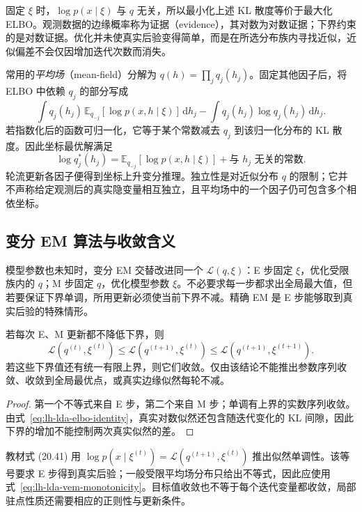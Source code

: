 固定 $\xi$ 时，$\log p(x\mid\xi)$ 与 $q$ 无关，所以最小化上述 KL 散度等价于最大化 ELBO。观测数据的边缘概率称为证据（evidence），其对数为对数证据；下界约束的是对数证据。优化并未使真实后验变得简单，而是在所选分布族内寻找近似，近似偏差不会仅因增加迭代次数而消失。

常用的\emph{平均场}（mean-field）分解为 $q(h)=\prod_jq_j(h_j)$。固定其他因子后，将 ELBO 中依赖 $q_j$ 的部分写成
\[
\int q_j(h_j)\,\mathbb E_{q_{-j}}[\log p(x,h\mid\xi)]\,\mathrm dh_j
-\int q_j(h_j)\log q_j(h_j)\,\mathrm dh_j.
\]
若指数化后的函数可归一化，它等于某个常数减去 $q_j$ 到该归一化分布的 KL 散度。因此坐标最优解满足
\begin{equation}
\log q_j^*(h_j)=\mathbb E_{q_{-j}}[\log p(x,h\mid\xi)]+\text{与 $h_j$ 无关的常数}.
\label{eq:lh-lda-mean-field-coordinate}
\end{equation}
轮流更新各因子便得到坐标上升变分推理。独立性是对近似分布 $q$ 的限制；它并不声称给定观测后的真实隐变量相互独立，且平均场中的一个因子仍可包含多个相依坐标。

\subsection{变分 EM 算法与收敛含义}
\label{subsec:lh-lda-variational-em-principle}

模型参数也未知时，变分 EM 交替改进同一个 $\mathcal L(q,\xi)$：E 步固定 $\xi$，优化受限族内的 $q$；M 步固定 $q$，优化模型参数 $\xi$。不必要求每一步都求出全局最大值，但若要保证下界单调，所用更新必须使当前下界不减。精确 EM 是 E 步能够取到真实后验的特殊情形。

\begin{proposition}[下界的单调性]
\label{prop:lh-lda-vem-monotonicity}
若每次 E、M 更新都不降低下界，则
\begin{equation}
\mathcal L(q^{(t)},\xi^{(t)})
\leq\mathcal L(q^{(t+1)},\xi^{(t)})
\leq\mathcal L(q^{(t+1)},\xi^{(t+1)}).
\label{eq:lh-lda-vem-monotonicity}
\end{equation}
若这些下界值还有统一有限上界，则它们收敛。仅由该结论不能推出参数序列收敛、收敛到全局最优点，或真实边缘似然每轮不减。
\end{proposition}
\begin{proof}
第一个不等式来自 E 步，第二个来自 M 步；单调有上界的实数序列收敛。由式~\eqref{eq:lh-lda-elbo-identity}，真实对数似然还包含随迭代变化的 KL 间隙，因此下界的增加不能控制两次真实似然的差。
\end{proof}

\begin{notealert}[type=caution,title={不能把精确 EM 的等号直接用于变分 EM}]
教材式 (20.41) 用 $\log p(x\mid\xi^{(t)})=\mathcal L(q^{(t+1)},\xi^{(t)})$ 推出似然单调性。该等号要求 E 步得到真实后验；一般受限平均场分布只给出不等式，因此应使用式~\eqref{eq:lh-lda-vem-monotonicity}。目标值收敛也不等于每个迭代变量都收敛，局部驻点性质还需要相应的正则性与更新条件。
\end{notealert}

